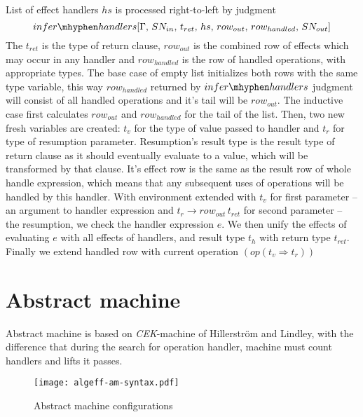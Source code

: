 \documentclass[inz, english, shortabstract]{iithesis}
\begin{document}
List of effect handlers $ hs $ is processed right-to-left by judgment 
$$ infer\mhyphen handlers [\Gamma , \, SN_{in} , \, t_{ret} , \, hs , \, row_{out} , \, row_{handled} , \, SN_{out}] $$
The $ t_{ret} $ is the type of return clause, $ row_{out} $ is the combined row of effects which may occur in any handler and $ row_{handled} $ is the row of handled operations, with appropriate types.
The base case of empty list initializes both rows with the same type variable, this way $ row_{handled} $ returned by $infer\mhyphen handlers$ judgment will consist of all handled operations and it's tail will be $ row_{out} $.
The inductive case first calculates $ row_{out} $ and $ row_{handled} $ for the tail of the list.
Then, two new fresh variables are created: $ t_v $ for the type of value passed to handler and $ t_r $ for type of resumption parameter.
Resumption's result type is the result type of return clause as it should eventually evaluate to a value, which will be transformed by that clause.
It's effect row is the same as the result row of whole handle expression, which means that any subsequent uses of operations will be handled by this handler.
With environment extended with $ t_v $ for first parameter -- an argument to handler expression and $ t_r \rightarrow row_{out} \, t_{ret} $ for second parameter -- the resumption, we check the handler expression $ e $.
We then unify the effects of evaluating $ e $ with all effects of handlers, and result type $ t_{h} $ with return type $ t_{ret} $.
Finally we extend handled row with current operation $ (op (t_v \Rightarrow t_r)) $

\section{Abstract machine}
Abstract machine is based on \emph{CEK}-machine of Hillerström and Lindley\cite{Hillerstrom2016}, with the difference that during the search for operation handler, machine must count handlers and lifts it passes.

\begin{figure}
  \centering
  \texttt{[image: algeff-am-syntax.pdf]}
  \caption{Abstract machine configurations}
  \label{fig:algeff-am-syntax}
\end{figure}
\end{document}
